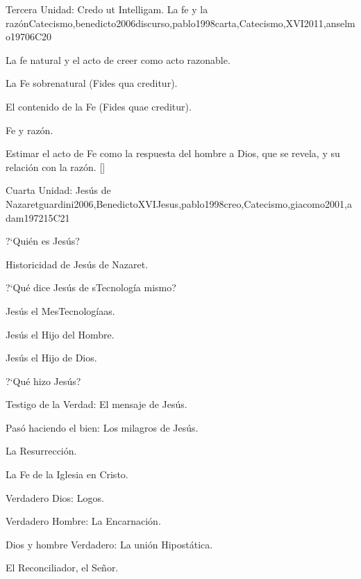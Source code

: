 \begin{syllabus}
\begin{unit}{}{Tercera Unidad: Credo ut Intelligam. La fe y la razón}{Catecismo,benedicto2006discurso,pablo1998carta,Catecismo,XVI2011,anselmo1970}{6}{C20}
\begin{topics}
	\item La fe natural y el acto de creer como acto razonable.
	\item La Fe sobrenatural (Fides qua creditur).
	\item El contenido de la Fe (Fides quae creditur).
	\item Fe y razón.
\end{topics}
\begin{learningoutcomes}
	\item Estimar el acto de Fe como la respuesta del hombre a Dios, que se revela, y su relación con la razón. [\Familiarity]
\end{learningoutcomes}
\end{unit}

\begin{unit}{}{Cuarta Unidad: Jesús de Nazaret}{guardini2006,BenedictoXVIJesus,pablo1998creo,Catecismo,giacomo2001,adam1972}{15}{C21}
\begin{topics}
	\item ?`Quién es Jesús?
	    \begin{subtopics}
		  \item Historicidad de Jesús de Nazaret.
	    \end{subtopics}
	\item ?`Qué dice Jesús de sTecnología mismo?
	    \begin{subtopics}
		\item Jesús el MesTecnologíaas.
		\item Jesús el Hijo del Hombre.
		\item Jesús el Hijo de Dios.
	    \end{subtopics}
	\item ?`Qué hizo Jesús?
	    \begin{subtopics}
		\item Testigo de la Verdad: El mensaje de Jesús.
		\item Pasó haciendo el bien: Los milagros de Jesús.
		\item La Resurrección.
	    \end{subtopics}
	\item La Fe de la Iglesia en Cristo.
	    \begin{subtopics}
		\item Verdadero Dios: Logos.
		\item Verdadero Hombre: La Encarnación.
		\item Dios y hombre Verdadero: La unión Hipostática.
		\item El Reconciliador, el Señor.
	    \end{subtopics}


\end{topics}
\end{unit}
\end{syllabus}
